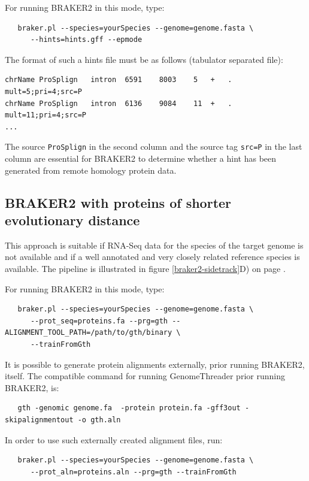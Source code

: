\documentclass[a4paper,10pt]{report}
\begin{document}
For running BRAKER2 in this mode, type:

\begin{verbatim}
   braker.pl --species=yourSpecies --genome=genome.fasta \
      --hints=hints.gff --epmode
\end{verbatim}

The format of such a hints file must be as follows (tabulator separated file):

\begin{verbatim}
chrName	ProSplign	intron	6591	8003	5	+	.	mult=5;pri=4;src=P
chrName	ProSplign	intron	6136	9084	11	+	.	mult=11;pri=4;src=P
...
\end{verbatim}

The source \texttt{ProSplign} in the second column and the source tag \texttt{src=P} in the last column are essential for BRAKER2 to determine whether a hint has been generated from remote homology protein data. 

\subsection{BRAKER2 with proteins of shorter evolutionary distance}\label{prot-in}

This approach is suitable if RNA-Seq data for the species of the target genome is not available and if a well annotated and very closely related reference species is available. The pipeline is illustrated in figure \ref{braker2-sidetrack}D) on page \pageref{braker2-sidetrack}.

For running BRAKER2 in this mode, type:

\begin{verbatim}
   braker.pl --species=yourSpecies --genome=genome.fasta \
      --prot_seq=proteins.fa --prg=gth --ALIGNMENT_TOOL_PATH=/path/to/gth/binary \
      --trainFromGth
\end{verbatim}

It is possible to generate protein alignments externally, prior running BRAKER2, itself. The compatible command for running GenomeThreader prior running BRAKER2, is:

\begin{verbatim}
   gth -genomic genome.fa  -protein protein.fa -gff3out -skipalignmentout -o gth.aln
\end{verbatim}


In order to use such externally created alignment files, run:

\begin{verbatim}
   braker.pl --species=yourSpecies --genome=genome.fasta \
      --prot_aln=proteins.aln --prg=gth --trainFromGth
\end{verbatim}
\end{document}
